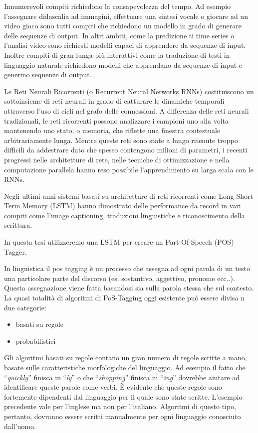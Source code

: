 Innumerevoli compiti richiedono la consapevolezza del tempo. Ad esempio l'assegnare
didascalia ad immagini, effettuare una sintesi vocale o giocare ad un video gioco
sono tutti compiti che richiedono un modello in grado di generare delle sequenze
di output. In altri ambiti, come la predizione ti time series o l'analisi video
sono richiesti modelli capaci di apprendere da sequenze di input. Inoltre compiti
di gran lunga pi\`u interattivi come la traduzione di testi in linguaggio naturale
richiedono modelli che apprendano da sequenze di input e generino sequenze di output.

Le Reti Neurali Ricorrenti (o Recurrent Neural Networks RNNs) costituiscono un
sottoinsieme di reti neurali in grado di catturare le dinamiche temporali attraverso
l'uso di cicli nel grafo delle connessioni. A differenza delle reti neurali
tradizionali, le reti ricorrenti possono analizzare i campioni uno alla volta
mantenendo uno stato, o memoria, che riflette una finestra contestuale arbitrariamente
lunga. Mentre queste reti sono state a lungo ritenute troppo difficili da addestrare
dato che spesso contengono milioni di parametri, i recenti progressi nelle
architetture di rete, nelle tecniche di ottimizzazione e nella computazione
parallela hanno reso possibile l'apprendimento su larga scala con le RNNs.

Negli ultimi anni sistemi basati su architetture di reti ricorrenti come Long
Short Term Memory (LSTM) hanno dimostrato delle performance da record in vari
compiti come l'image captioning, traduzioni linguistiche e riconoscimento della
scrittura.

In questa tesi utilizzeremo una LSTM per creare un Part-Of-Speech (POS) Tagger.

In linguistica il pos tagging \`e un processo che assegna ad ogni parola di un
testo una particolare parte del discorso (es. sostantivo, aggettivo, pronome ecc..).
Questa assegnazione viene fatta basandosi sia sulla parola stessa che sul contesto.
La quasi totalit\`a di algoritmi di PoS-Tagging oggi esistente pu\`o essere divisa
n due categorie:

\begin{itemize}
  \item basati su regole
  \item probabilistici
\end{itemize}

Gli algoritmi basati su regole contano un gran numero di regole scritte a mano,
basate sulle caratteristiche morfologiche del linguaggio. Ad esempio il fatto che
``\emph{quickly}'' finisca in ``\emph{ly}'' o che ``\emph{shopping}'' finisca in
``\emph{ing}'' dovrebbe aiutare ad identificare queste parole come verbi. \`E
evidente che queste regole sono fortemente dipendenti dal linguaggio per il quale
sono state scritte. L'esempio precedente vale per l'inglese ma non per l'italiano.
Algoritmi di questo tipo, pertanto, dovranno essere scritti manualmente per ogni
linguaggio conosciuto dall'uomo.

